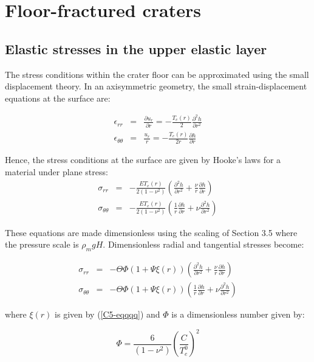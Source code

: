 \chapter{Floor-fractured craters}
\label{chap:A4}

\section{Elastic stresses in the upper elastic layer}
\label{C5-AppendixB}
The  stress conditions  within the  crater floor  can be  approximated
using the small displacement theory.  In an axisymmetric geometry, the
small strain-displacement equations at the surface are:

\begin{eqnarray}
  \epsilon_{rr}&=&\frac{\partial u_{r}}{\partial r}=-\frac{T_{e}(r)}{2}\frac{\partial^{2} h}{\partial r^{2}}\\
  \epsilon_{\theta\theta}&=&\frac{u_{r}}{r}=-\frac{T_{e}(r)}{2r}\frac{\partial h}{\partial r} 
\end{eqnarray}

Hence, the stress conditions at the  surface are given by Hooke's laws
for a material under plane stress:
\begin{eqnarray}
  \sigma_{rr}&=&-\frac{E T_{e}(r)}{2(1-\nu^2)}\left (\frac{\partial^{2} h}{\partial r^{2}} +\frac{\nu}{r}\frac{\partial h}{\partial r} \right)\\
  \sigma_{\theta\theta}&=&-\frac{E T_{e}(r)}{2(1-\nu^2)}\left (\frac{1}{r}\frac{\partial h}{\partial r}+\nu \frac{\partial^{2}h}{\partial r^2}\right)
\end{eqnarray}

These equations  are made dimensionless  using the scaling  of Section
3.5 where the pressure scale is $\rho_m g H$. Dimensionless radial and
tangential stresses become:

\begin{eqnarray}
  \sigma_{rr}&=&- \Theta \Phi \left(1+\Psi \xi(r)\right) \left ( \frac{\partial^{2} h}{\partial r^{2}} +\frac{\nu}{r}\frac{\partial h}{\partial r} \right) \\
  \sigma_{\theta\theta}&=&- \Theta \Phi \left(1+\Psi \xi(r)\right) \left (\frac{1}{r}\frac{\partial h}{\partial r}+\nu \frac{\partial^{2}h}{\partial r^2}\right)
\end{eqnarray}

where  $\xi(r)$  is   given  by  (\ref{C5-eqqqq})  and   $\Phi$  is  a
dimensionless number given by:

\begin{equation}
  \Phi= \frac{6 }{(1-\nu^2)}\left( \frac{C}{T_{e}^0} \right)^{2}
\end{equation}

